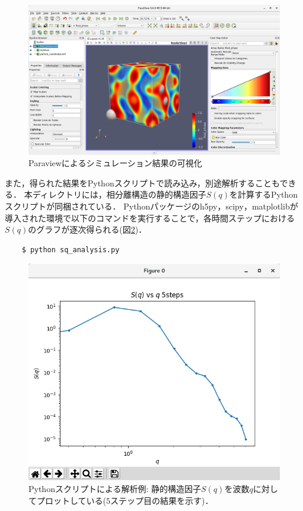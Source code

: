 \documentclass[pdflatex,a4paper,10pt,ja=standard]{bxjsarticle}
\begin{document}
\begin{figure}[htbp]
    \centering
    \includegraphics[width=13truecm]{paraview_ss.png}
    \caption{Paraviewによるシミュレーション結果の可視化}
    \label{fig:paraview}
\end{figure}

また，得られた結果をPythonスクリプトで読み込み，別途解析することもできる．
本ディレクトリには，相分離構造の静的構造因子$S(q)$を計算するPythonスクリプトが同梱されている．
Pythonパッケージのh5py，scipy，matplotlibが導入された環境で以下のコマンドを実行することで，各時間ステップにおける$S(q)$のグラフが逐次得られる(図\ref{fig:sq_vs_q})．

\begin{verbatim}
    $ python sq_analysis.py
\end{verbatim}

\begin{figure}[htbp]
    \centering
    \includegraphics[width=9truecm]{sq_vs_q.png}
    \caption{Pythonスクリプトによる解析例: 静的構造因子$S(q)$を波数$q$に対してプロットしている($5$ステップ目の結果を示す)．}
    \label{fig:sq_vs_q}
\end{figure}
\end{document}
